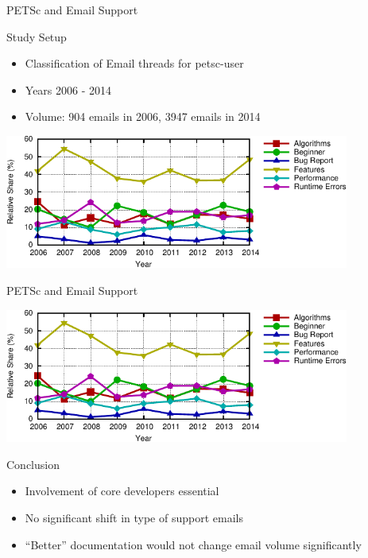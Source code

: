 

\begin{frame}{PETSc and Email Support}
  \begin{block}{Study Setup}
  \begin{itemize}
   \item Classification of Email threads for petsc-user
   \item Years 2006 - 2014
   \item Volume: 904 emails in 2006, 3947 emails in 2014
  \end{itemize}
  \end{block}

  
  \begin{center}
    \includegraphics[width=0.85\textwidth]{figures/emails}
  \end{center}

\end{frame}


\begin{frame}{PETSc and Email Support}
  \begin{center}
    \includegraphics[width=0.85\textwidth]{figures/emails}
  \end{center}

  \begin{block}{Conclusion}
  \begin{itemize}
   \item Involvement of core developers essential
   \item No significant shift in type of support emails
   \item ``Better'' documentation would not change email volume significantly
  \end{itemize}
  \end{block}

\end{frame}


